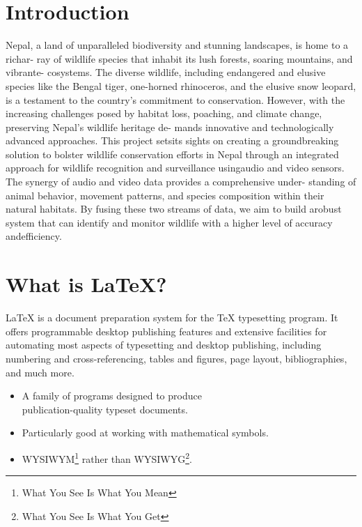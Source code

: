 \documentclass[fleqn, 10pt, twoside, blindreview]{IOEGC}
\begin{document}
\maketitle
\thispagestyle{firstpage} 

\section{Introduction}              
Nepal, a land of unparalleled biodiversity and stunning landscapes, is home to a richar-
ray of wildlife species that inhabit its lush forests, soaring mountains, and vibrante-
cosystems. The diverse wildlife, including endangered and elusive species like the
Bengal tiger, one-horned rhinoceros, and the elusive snow leopard, is a testament to the
country’s commitment to conservation. However, with the increasing challenges posed
by habitat loss, poaching, and climate change, preserving Nepal’s wildlife heritage de-
mands innovative and technologically advanced approaches. This project setsits sights
on creating a groundbreaking solution to bolster wildlife conservation efforts in Nepal
through an integrated approach for wildlife recognition and surveillance usingaudio and
video sensors. The synergy of audio and video data provides a comprehensive under-
standing of animal behavior, movement patterns, and species composition within their
natural habitats. By fusing these two streams of data, we aim to build arobust system
that can identify and monitor wildlife with a higher level of accuracy andefficiency.



\section{What is \LaTeX?} \label{sec:whatis}
\LaTeX{} is a document preparation system for the \TeX{}
typesetting program. It offers programmable desktop publishing features and 
extensive facilities for automating most aspects of typesetting and desktop  
publishing, including numbering and cross-referencing,
tables and figures, page layout, bibliographies, and much more. 

\begin{itemize}[noitemsep]
	\item A family of programs designed to produce \\publication-quality typeset
		documents.
	\item Particularly good at working with mathematical symbols.
	\item WYSIWYM\footnote{What You See Is What You Mean} rather than 
		WYSIWYG\footnote{What You See Is What You Get}.
\end{itemize}
\end{document}
